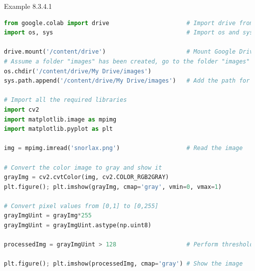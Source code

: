 \documentclass{book}
\begin{document}
\begin{egBox}{Example 8.3.4.1}{}
    \begin{lstlisting}[language=Python, basicstyle=\ttfamily\small, keywordstyle=\color{blue}, commentstyle=\color{forestgreen}, stringstyle=\color{red}, showstringspaces=false]
from google.colab import drive                      # Import drive from google.colab package
import os, sys                                      # Import os and sys modules

drive.mount('/content/drive')                       # Mount Google Drive
# Assume a folder "images" has been created, go to the folder "images"
os.chdir('/content/drive/My Drive/images')
sys.path.append('/content/drive/My Drive/images')   # Add the path for interpreter to search

# Import all the required libraries
import cv2
import matplotlib.image as mpimg
import matplotlib.pyplot as plt

img = mpimg.imread('snorlax.png')                   # Read the image

# Convert the color image to gray and show it
grayImg = cv2.cvtColor(img, cv2.COLOR_RGB2GRAY)
plt.figure(); plt.imshow(grayImg, cmap='gray', vmin=0, vmax=1)

# Convert pixel values from [0,1] to [0,255]
grayImgUint = grayImg*255
grayImgUint = grayImgUint.astype(np.uint8)

processedImg = grayImgUint > 128                    # Perform thresholding

plt.figure(); plt.imshow(processedImg, cmap='gray') # Show the image


\end{lstlisting}
\end{egBox}
\end{document}
